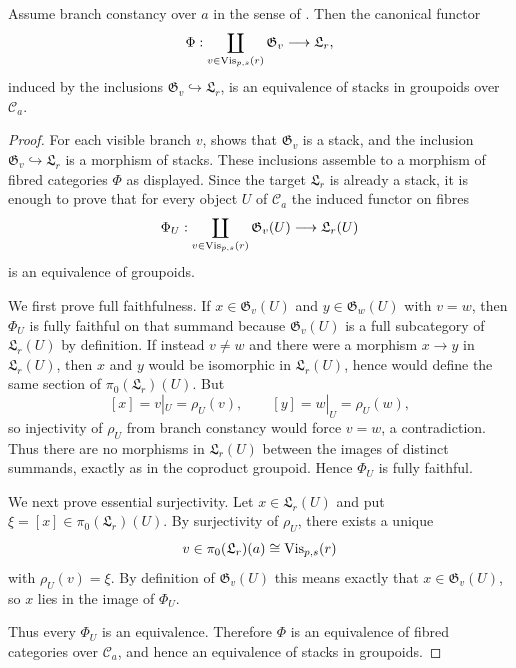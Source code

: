 \begin{corollary}\label{cor:branch-decomposition}
Assume branch constancy over $a$ in the sense of
. Then the canonical functor
\[
\Phi:\coprod_{v\in\mathrm{Vis}_{p,s}(r)}\mathfrak G_v\longrightarrow \mathfrak L_r,
\]
induced by the inclusions $\mathfrak G_v\hookrightarrow \mathfrak L_r$, is an
equivalence of stacks in groupoids over $\mathcal C_a$.
\end{corollary}

\begin{proof}
For each visible branch $v$,  shows
that $\mathfrak G_v$ is a stack, and the inclusion
$\mathfrak G_v\hookrightarrow \mathfrak L_r$ is a morphism of stacks. These
inclusions assemble to a morphism of fibred categories $\Phi$ as displayed.
Since the target $\mathfrak L_r$ is already a stack, it is enough to prove that
for every object $U$ of $\mathcal C_a$ the induced functor on fibres
\[
\Phi_U:\coprod_{v\in\mathrm{Vis}_{p,s}(r)}\mathfrak G_v(U)\longrightarrow \mathfrak L_r(U)
\]
is an equivalence of groupoids.

We first prove full faithfulness. If
$x\in \mathfrak G_v(U)$ and $y\in \mathfrak G_w(U)$ with $v=w$, then
$\Phi_U$ is fully faithful on that summand because $\mathfrak G_v(U)$ is a full
subcategory of $\mathfrak L_r(U)$ by definition. If instead $v\neq w$ and
there were a morphism $x\to y$ in $\mathfrak L_r(U)$, then $x$ and $y$ would be
isomorphic in $\mathfrak L_r(U)$, hence would define the same section of
$\pi_0(\mathfrak L_r)(U)$. But
\[
[x]=v|_U=\rho_U(v),
\qquad
[y]=w|_U=\rho_U(w),
\]
so injectivity of $\rho_U$ from branch constancy would force $v=w$, a
contradiction. Thus there are no morphisms in $\mathfrak L_r(U)$ between the
images of distinct summands, exactly as in the coproduct groupoid. Hence
$\Phi_U$ is fully faithful.

We next prove essential surjectivity. Let $x\in \mathfrak L_r(U)$ and put
$\xi=[x]\in\pi_0(\mathfrak L_r)(U)$. By surjectivity of $\rho_U$, there exists
a unique
\[
v\in\pi_0(\mathfrak L_r)(a)\cong \mathrm{Vis}_{p,s}(r)
\]
with $\rho_U(v)=\xi$. By definition of $\mathfrak G_v(U)$ this means exactly
that $x\in \mathfrak G_v(U)$, so $x$ lies in the image of $\Phi_U$.

Thus every $\Phi_U$ is an equivalence. Therefore $\Phi$ is an equivalence of
fibred categories over $\mathcal C_a$, and hence an equivalence of stacks in
groupoids.
\end{proof}


